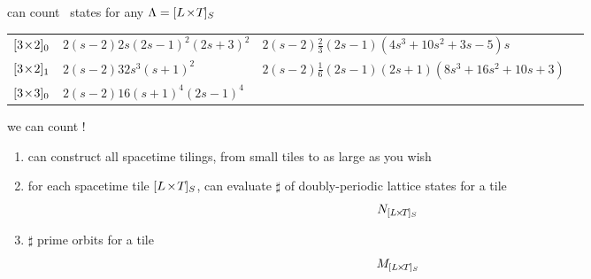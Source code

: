 \begin{frame}{can count \catlatt\ states for any $\Lambda={[{L_{}}\!\times\!{T_{}}]_{S_{}}}$}
\begin{center}
{\begin{tabular}{lllr}
${[3\!\times\!2]_{0}}$    & $2({s}-2)2s(2{s}-1)^2 (2{s}+3)^2$
	& $2({s}-2)\frac{2}{3}(2{s}-1)(4{s}^3+10{s}^2+3{s}-5)s$
                                  &  \\
${[3\!\times\!2]_{1}}$  & $2({s}-2)32{s}^3({s}+1)^2$
	& $2 ({s}-2) \frac{1}{6} (2 {s}-1) (2 {s}+1) (8 {s}^3+16 {s}^2+10 {s}+3)$
                                  &  \\
${[3\!\times\!3]_{0}}$    & $2({s}-2)16({s}+1)^4(2{s}-1)^4$
                                  &  \\
\end{tabular}
} %
\end{center}
\end{frame} %

\begin{frame}{we can count !}

\begin{enumerate}
  \item can construct all spacetime tilings,
  from small tiles to as large as you wish
  \item for each spacetime tile ${[{L_{}}\!\times\!{T_{}}]_{S_{}}}$,
can evaluate
$\sharp$ of doubly-periodic {\color{blue}lattice states} for a tile
\[
N_{{[{L_{}}\!\times\!{T_{}}]_{S_{}}}}
\]
  \item
$\sharp$ {\color{blue}prime orbits} for a tile
\[
M_{{[{L_{}}\!\times\!{T_{}}]_{S_{}}}}
\]
\end{enumerate}
\end{frame} %

